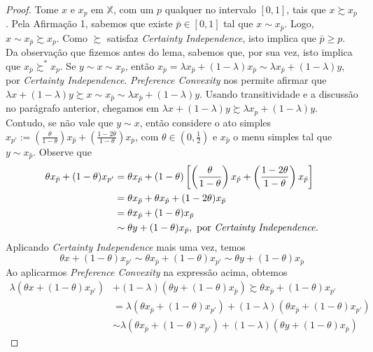 \documentclass[12pt, a4paper]{article}
\theoremstyle{nonumberplain}
\newtheorem{proof}{Dem.}
\theoremstyle{plain}
\theoremstyle{plain}
\theoremstyle{plain}
\theoremstyle{nonumberplain}
\begin{document}
\begin{proof}
Tome $x$ e $x_p$ em $\mathbb{X}$, com um $p$ qualquer no intervalo $[0,1]$, tais que $x\succsim x_p$. Pela Afirmação 1, sabemos que existe $\bar{p}\in [0,1]$ tal que $x\sim x_{\bar{p}}$. Logo, $x\sim x_{\bar{p}}\succsim x_p$. Como $\succsim$ satisfaz \emph{Certainty Independence}, isto implica que $\bar{p}\geq p$. Da observação que fizemos antes do lema, sabemos que, por sua vez, isto implica que $x_{\bar{p}}\succsim^* x_p$.
Se $y\sim x\sim x_{\bar{p}}$, então $x_{\bar{p}}=\lambda x_{\bar{p}} + (1-\lambda)x_{\bar{p}}\sim\lambda x_{\bar{p}}+(1-\lambda)y$, por \emph{Certainty Independence}. \emph{Preference Convexity} nos permite afirmar que $\lambda x+(1-\lambda)y \succsim x \sim x_{\bar{p}} \sim \lambda x_{\bar{p}}+(1-\lambda)y$. Usando transitividade e a discussão no parágrafo anterior, chegamos em $\lambda x+(1-\lambda)y\succsim \lambda x_p + (1-\lambda)y$.
Contudo, se não vale que $y\sim x$, então considere o ato simples $x_{p'}:=\left(\frac{\theta}{1-\theta}\right)x_{\hat{p}}+\left(\frac{1-2\theta}{1-\theta}\right)x_{\bar{p}}$, com $\theta\in \left(0,\frac{1}{2}\right)$ e $x_{\hat{p}}$ o menu simples tal que $y\sim x_{\hat{p}}$. Observe que
\begin{align*}
\theta x_{\bar{p}} + (1-\theta)x_{p'}&=\theta x_{\bar{p}} + (1-\theta)\left[ \left(\frac{\theta}{1-\theta}\right)x_{\hat{p}}+\left(\frac{1-2\theta}{1-\theta}\right)x_{\bar{p}}\right] \\
&=\theta x_{\bar{p}} + \theta x_{\hat{p}} + (1-2\theta)x_{\bar{p}} \\
&=\theta x_{\hat{p}} + (1-\theta)x_{\bar{p}} \\
&\sim \theta y + (1-\theta) x_{\bar{p}}, \text{ por \emph{Certainty Independence.}}
\end{align*}
Aplicando \emph{Certainty Independence} mais uma vez, temos $$\theta x + (1-\theta)x_{p'}\sim \theta x_{\bar{p}} + (1-\theta)x_{p'}\sim \theta y + (1-\theta) x_{\bar{p}}$$
Ao aplicarmos \emph{Preference Convexity} na expressão acima, obtemos
\begin{align*}
\lambda (\theta x + (1-\theta)x_{p'})&+(1-\lambda)(\theta y + (1-\theta) x_{\bar{p}}) \succsim \theta x_{\bar{p}} + (1-\theta)x_{p'}\\
&= \lambda (\theta x_{\bar{p}} + (1-\theta)x_{p'}) + (1-\lambda)(\theta x_{\bar{p}} + (1-\theta)x_{p'})\\
&\sim \lambda(\theta x_{\bar{p}} + (1-\theta)x_{p'})+(1-\lambda)(\theta y + (1-\theta) x_{\bar{p}})
\end{align*}

\end{proof}
\end{document}
